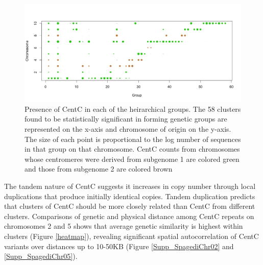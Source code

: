 \begin{figure}[h]
\centering
\includegraphics[width=1\textwidth]{Fig2_TWgroups}
\caption{Presence of CentC in each of the heirarchical groups.  The 58 clusters found to be statistically significant in forming genetic groups are represented on the x-axis and chromosome of origin on the y-axis. The size of each point is proportional to the log number of sequences in that group on that chromosome. CentC counts from chromosomes whose centromeres were derived from subgenome 1 are colored green and those from subgenome 2 are colored brown 
}
\label{pcoa}    
\end{figure}

The tandem nature of CentC suggests it increases in copy number through local duplications that produce initially identical copies.  
Tandem duplication predicts that  clusters of CentC should be more closely related than CentC from different clusters.  
Comparisons of genetic and physical distance among CentC repeats on chromosomes 2 and 5 shows that average genetic similarity is highest within clusters (Figure \ref{heatmap}), revealing significant spatial autocorrelation of CentC variants over distances up to 10-50KB (Figure \ref{Supp_SpagediChr02} and \ref{Supp_SpagediChr05}).

